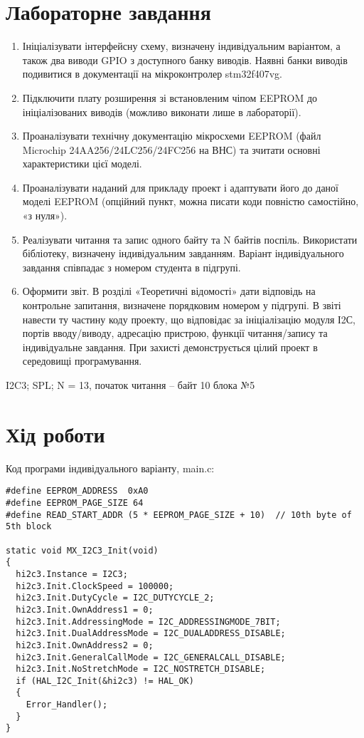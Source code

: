 \documentclass[oneside,14pt]{extarticle}
\begin{document}
\begin{normalsize}
  \section*{Лабораторне завдання}
  \begin{enumerate}
  	\item Ініціалізувати інтерфейсну схему, визначену індивідуальним варіантом, а
також два виводи GPIO з доступного банку виводів. Наявні банки виводів
подивитися в документації на мікроконтролер stm32f407vg.
  \item Підключити плату розширення зі встановленим чіпом EEPROM до
ініціалізованих виводів (можливо виконати лише в лабораторії).
  \item Проаналізувати технічну документацію мікросхеми EEPROM (файл
Microchip 24AA256/24LC256/24FC256 на ВНС) та зчитати основні
характеристики цієї моделі.
  \item Проаналізувати наданий для прикладу проект і адаптувати його до даної
моделі EEPROM (опційний пункт, можна писати коди повністю
самостійно, «з нуля»).
  \item Реалізувати читання та запис одного байту та N байтів поспіль.
Використати бібліотеку, визначену індивідуальним завданням. Варіант
індивідуального завдання співпадає з номером студента в підгрупі.
  \item Оформити звіт. В розділі «Теоретичні відомості» дати відповідь на
контрольне запитання, визначене порядковим номером у підгрупі. В звіті
навести ту частину коду проекту, що відповідає за ініціалізацію модуля
І2С, портів вводу/виводу, адресацію пристрою, функції читання/запису та
індивідуальне завдання. При захисті демонструється цілий проект в
середовищі програмування.
  \end{enumerate}
  
  I2C3; SPL; N = 13, початок читання – байт 10 блока №5
  
  \section*{Хід роботи}
  
  Код програми індивідуального варіанту, main.c:
  
	{\small\begin{lstlisting}
#define EEPROM_ADDRESS  0xA0
#define EEPROM_PAGE_SIZE 64
#define READ_START_ADDR (5 * EEPROM_PAGE_SIZE + 10)  // 10th byte of 5th block

static void MX_I2C3_Init(void)
{
  hi2c3.Instance = I2C3;
  hi2c3.Init.ClockSpeed = 100000;
  hi2c3.Init.DutyCycle = I2C_DUTYCYCLE_2;
  hi2c3.Init.OwnAddress1 = 0;
  hi2c3.Init.AddressingMode = I2C_ADDRESSINGMODE_7BIT;
  hi2c3.Init.DualAddressMode = I2C_DUALADDRESS_DISABLE;
  hi2c3.Init.OwnAddress2 = 0;
  hi2c3.Init.GeneralCallMode = I2C_GENERALCALL_DISABLE;
  hi2c3.Init.NoStretchMode = I2C_NOSTRETCH_DISABLE;
  if (HAL_I2C_Init(&hi2c3) != HAL_OK)
  {
    Error_Handler();
  }
}


\end{lstlisting}}
\end{normalsize}
\end{document}
